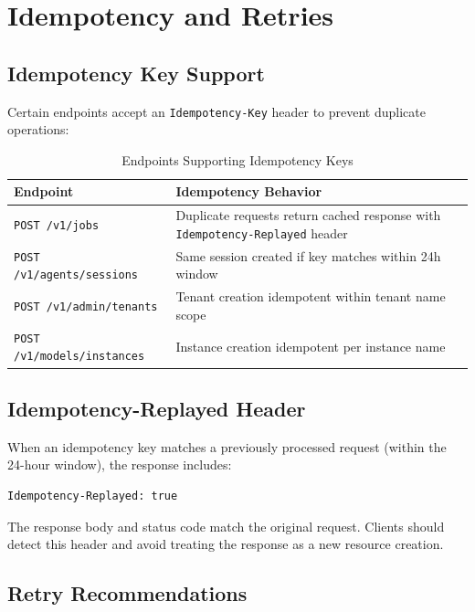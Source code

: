 \section{Idempotency and Retries}
\label{app:api:idempotency}

\subsection{Idempotency Key Support}

Certain endpoints accept an \texttt{Idempotency-Key} header to prevent duplicate operations:

\begin{table}[ht]
\centering
\caption{Endpoints Supporting Idempotency Keys}
\label{tab:idempotency-endpoints}
\small
\begin{tabularx}{\textwidth}{lX}
    \hline
    \textbf{Endpoint} & \textbf{Idempotency Behavior} \\
    \hline
    \texttt{POST /v1/jobs} & Duplicate requests return cached response with \texttt{Idempotency-Replayed} header \\
    \texttt{POST /v1/agents/sessions} & Same session created if key matches within 24h window \\
    \texttt{POST /v1/admin/tenants} & Tenant creation idempotent within tenant name scope \\
    \texttt{POST /v1/models/instances} & Instance creation idempotent per instance name \\
    \hline
\end{tabularx}
\end{table}

\subsection{Idempotency-Replayed Header}

When an idempotency key matches a previously processed request (within the 24-hour window), the response includes:

\begin{lstlisting}[language=bash]
Idempotency-Replayed: true
\end{lstlisting}

The response body and status code match the original request. Clients should detect this header and avoid treating the response as a new resource creation.

\subsection{Retry Recommendations}

